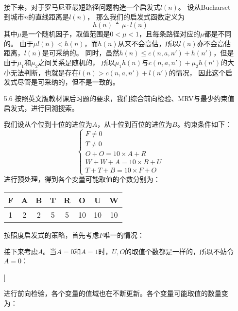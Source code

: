 \documentclass[UTF8,zihao=-4]{ctexart}
\begin{document}
\begin{itemize}
		接下来，对于罗马尼亚最短路径问题构造一个启发式$l(n)$。
		设从Bucharset到城市$n$的直线距离是$l(n)$，
		那么我们的启发式函数定义为
		$$
			h(n)\triangleq \mu \cdot l(n)
		$$
		其中$\mu$是一个随机因子，取值范围是$0< \mu <1$，且每条路径对应的$\mu$都是不同的。
		由于$\mu l(n) < h(n)$，而$h(n)$从来不会高估，所以$l(n)$亦不会高估距离，$l(n)$是可采纳的。
		同时，虽然$h(n) \leq c(n,a,n') + h(n')$，但是由于$\mu _1$和$\mu _2$之间关系是随机的，
		所以$\mu _1 h(n)$与$c(n,a,n')+\mu _2 h(n')$的大小无法判断，也就是存在$l(n)>c(n,a,n')+l(n')$的情况，
		因此这个启发式尽管是可采纳的，但不是一致的。
		\item[5.6] 按照英文版教材课后习题的要求，我们综合前向检验、MRV与最少约束值启发式，进行回溯搜索。
		
		我们设从个位到十位的进位为$A$，从十位到百位的进位为$B$。约束条件如下：
		\begin{equation*}
			\begin{cases}
				F \neq 0 \\
				T \neq 0 \\
				O + O = 10 \times A + R \\
				W + W + A = 10 \times B + U \\
				T + T + B = 10 \times F + O
			\end{cases}
		\end{equation*}
		进行预处理，得到各个变量可能取值的个数分别为：
		\begin{center}
			\begin{tabular}{|c|c|c|c|c|c|c|c|}
				\hline
				F & A & B & T & R & O & U & W \\ \hline
				1 & 2 & 2 & 5 & 5 & 10 & 10 & 10 \\ \hline
			\end{tabular}
		\end{center}
		按照度启发式的策略，首先考虑$F$唯一的情况：
		\begin{center}
			\begin{forest}
				[{$F=0$}]
			\end{forest}
		\end{center}
		接下来考虑$A$。当$A=0$和$A=1$时，$U,O$的取值个数都是一样的，所以不妨令$A=0$：
		\begin{center}
			\begin{forest}
				[{$F=1$}
					[{$A=0$}]
				]
			\end{forest}
		\end{center}
		进行前向检验，各个变量的值域也在不断更新。各个变量可能取值的数量变为：
		\begin{center}
			\begin{tabular}{|c|c|c|c|c|c|}

\end{tabular}
\end{center}
\end{itemize}
\end{document}
